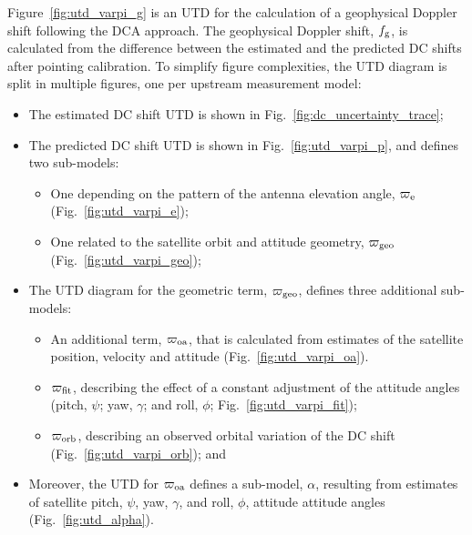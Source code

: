 Figure~\ref{fig:utd_varpi_g} is an \ac{UTD} for the calculation of a
geophysical Doppler shift following the \ac{DCA} approach. The geophysical
Doppler shift, $f_{\rm g}$, is calculated from the difference between the
estimated and the predicted \ac{DC} shifts after pointing calibration. To
simplify figure complexities, the \ac{UTD} diagram is split in multiple
figures, one per upstream measurement model:
\begin{itemize}
  \item The estimated DC shift \ac{UTD} is shown in
    Fig.~\ref{fig:dc_uncertainty_trace};
  \item The predicted DC shift \ac{UTD} is shown in Fig.~\ref{fig:utd_varpi_p},
    and defines two sub-models:
  \begin{itemize}
    \item One depending on the pattern of the antenna elevation angle,
      $\varpi_{\rm e}$ (Fig.~\ref{fig:utd_varpi_e});
    \item One related to the satellite orbit and attitude geometry,
      $\varpi_{\rm geo}$ (Fig.~\ref{fig:utd_varpi_geo});
  \end{itemize}
  \item The \ac{UTD} diagram for the geometric term, $\varpi_{\rm geo}$,
    defines three additional sub-models:
    \begin{itemize}
      \item An additional term, $\varpi_{\rm oa}$, that is calculated from
        estimates of the satellite position, velocity and attitude
        (Fig.~\ref{fig:utd_varpi_oa}).
      \item $\varpi_{\rm fit}$, describing the effect of a constant adjustment of
        the attitude angles (pitch, $\psi$; yaw, $\gamma$; and roll, $\phi$;
        Fig.~\ref{fig:utd_varpi_fit});
      \item $\varpi_{\rm orb}$, describing an observed orbital variation of the
        DC shift (Fig.~\ref{fig:utd_varpi_orb}); and
    \end{itemize}
  \item Moreover, the \ac{UTD} for $\varpi_{\rm oa}$ defines a sub-model,
    $\alpha$, resulting from estimates of satellite pitch, $\psi$, yaw,
    $\gamma$, and roll, $\phi$, attitude attitude angles
    (Fig.~\ref{fig:utd_alpha}).
\end{itemize}

